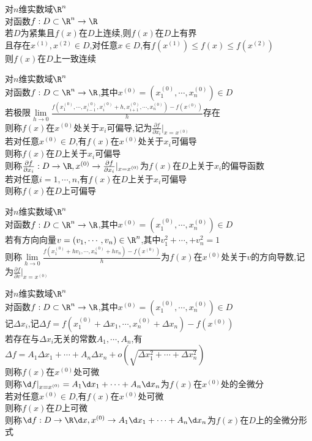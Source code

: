 \begin{dingli}
对$n$维实数域$\R^n$\\
对函数$f:D\subset \R^n \to \R$\\
若$D$为紧集且$f(x)$在$D$上连续,则$f(x)$在$D$上有界\\
且存在$x^{(1)},x^{(2)}\in D$,对任意$x\in D$,有$f(x^{(1)})\leq f(x)\leq f(x^{(2)})$\\
则$f(x)$在$D$上一致连续
\end{dingli}

\begin{dingyi}
对$n$维实数域$\R^n$\\
对函数$f:D\subset \R^n \to \R$,其中$x^{(0)}=(x_1^{(0)},\cdots,x_n^{(0)})\in D$\\
若极限$\lim\limits_{h\to 0}\frac{f(x_1^{(0)},\cdots,x_{i-1}^{(0)},x_i^{(0)}+h,x_{i+1}^{(0)},\cdots,x_n^{(0)})-f(x^{(0)})}{h}$存在\\
则称$f(x)$在$x^{(0)}$处关于$x_i$可偏导,记为$\frac{\partial f}{\partial x_i}|_{x=x^{(0)}}$\\
若对任意$x^{(0)}\in D$,有$f(x)$在$x^{(0)}$处关于$x_i$可偏导\\
则称$f(x)$在$D$上关于$x_i$可偏导\\
则称$\frac{\partial f}{\partial x_i}:D\to \R,x^{(0)}\to \frac{\partial f}{\partial x_i}|_{x=x^{(0)}}$为$f(x)$在$D$上关于$x_i$的偏导函数\\
若对任意$i=1,\cdots,n$,有$f(x)$在$D$上关于$x_i$可偏导\\
则称$f(x)$在$D$上可偏导
\end{dingyi}

\begin{dingyi}
对$n$维实数域$\R^n$\\
对函数$f:D\subset \R^n \to \R$,其中$x^{(0)}=(x_1^{(0)},\cdots,x_n^{(0)})\in D$\\
若有方向向量$v=(v_1,\cdots,v_n)\in\R^n$,其中$v_1^2+\cdots,+v_n^2=1$\\
则称$\lim\limits_{h\to 0}\frac{f(x_1^{(0)}+hv_1,\cdots,x_n^{(0)}+hv_n)-f(x^{(0)})}{h}$为$f(x)$在$x^{(0)}$处关于$v$的方向导数,记为$\frac{\partial f}{\partial v}|_{x=x^{(0)}}$
\end{dingyi}

\begin{dingyi}
对$n$维实数域$\R^n$\\
对函数$f:D\subset \R^n \to \R$,其中$x^{(0)}=(x_1^{(0)},\cdots,x_n^{(0)})\in D$\\
记$\Delta x_i$,记$\Delta f=f(x_1^{(0)}+\Delta x_1,\cdots,x_n^{(0)}+\Delta x_n)-f(x^{(0)})$\\
若存在与$\Delta x_i$无关的常数$A_1,\cdots,A_n$,有$\Delta f=A_1\Delta x_1+\cdots+A_n\Delta x_n+o(\sqrt{\Delta x_1^2+\cdots+\Delta x_n^2})$\\
则称$f(x)$在$x^{(0)}$处可微\\
则称$\d f|_{x=x^{(0)}}=A_1\d x_1+\cdots+A_n\d x_n$为$f(x)$在$x^{(0)}$处的全微分\\
若对任意$x^{(0)}\in D$,有$f(x)$在$x^{(0)}$处可微\\
则称$f(x)$在$D$上可微\\
则称$\d f:D\to \R\d x,x^{(0)}\to A_1\d x_1+\cdots+A_n\d x_n$为$f(x)$在$D$上的全微分形式
\end{dingyi}

